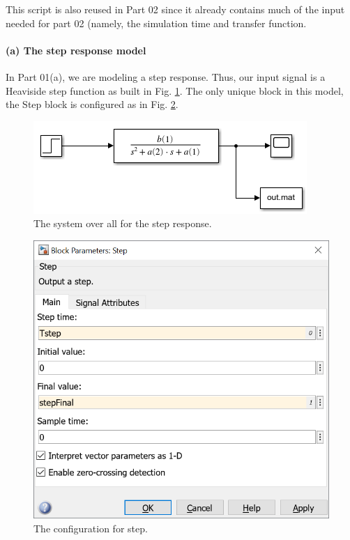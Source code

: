 \documentclass[12pt]{article}
\begin{document}
This script is also reused in Part 02 since it already contains much of the input needed for part 02 (namely, the simulation time and transfer function.

\paragraph{(a) The step response model}

In Part 01(a), we are modeling a step response. Thus, our input signal is a Heaviside step function as built in Fig. \ref{fig:step response model system}.
The only unique block in this model, the Step block is configured as in Fig. \ref{fig:step response model parameters}.

\begin{figure}[h]
    \centering
    \includegraphics[width=\linewidth]{part01a_step_response_model.png}
    \caption{The system over all for the step response.}
    \label{fig:step response model system}
\end{figure}

\begin{figure}[h]
    \centering
    \includegraphics[width=(5in/689)*689]{part01a_step_parameters.png}
    \caption{The configuration for step.}
    \label{fig:step response model parameters}
\end{figure}
\end{document}
